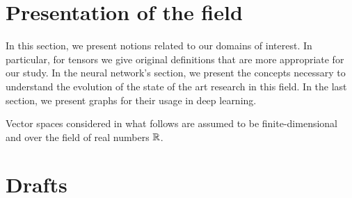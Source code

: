 \documentclass[12pt]{book}
\begin{document}

%
%


%
%

\dominitoc
\tableofcontents

%
%

%

%
%


%
%

\setcounter{chapter}{1}
\chapter{Presentation of the field}

In this section, we present notions related to our domains of interest. In particular, for tensors we give original definitions that are more appropriate for our study. In the neural network's section, we present the concepts necessary to understand the evolution of the state of the art research in this field. In the last section, we present graphs for their usage in deep learning.

Vector spaces considered in what follows are assumed to be finite-dimensional and over the field of real numbers $\mathbb{R}$.

\vfill
\minitoc
\newpage


\newpage


\newpage


\newpage

%
%



%
%

%
%

%
%

%
%

\setcounter{chapter}{-1}
\chapter{Drafts}

\newpage
\end{document}
